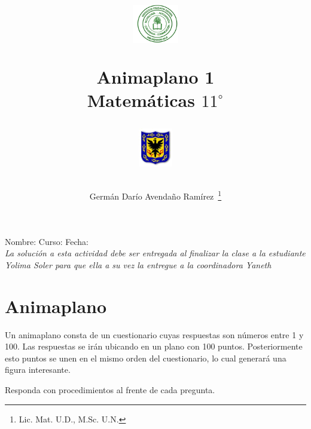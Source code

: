 \documentclass[11pt,twoside]{article}
\author{Germ\'an Dar\'io Avenda\~no Ram\'irez~\thanks{Lic. Mat. U.D., M.Sc. U.N.}}
\title{\begin{minipage}{0.2\textwidth}\includegraphics[height=1.7cm]{Images/logo-colegio.png}
\end{minipage}\hfill
\begin{minipage}{0.55\textwidth}\begin{center}
Animaplano 1\\Matemáticas $11^{\circ}$\end{center}
\end{minipage}
\begin{minipage}{.2\textwidth}
\includegraphics[height=1.7cm]{Images/logo-sed.png} 
\end{minipage}}
\date{}
\begin{document}
\maketitle
Nombre: \hrulefill Curso: \underline{\hspace{1cm}}  Fecha: \underline{\hspace{2cm}}\\

\emph{La solución a esta actividad debe ser entregada al finalizar la clase a la estudiante Yolima Soler para que ella a su vez la entregue a la coordinadora Yaneth}
\section{Animaplano}
Un animaplano consta de un cuestionario cuyas respuestas son números entre 1 y 100. Las respuestas se irán ubicando en un plano con 100 puntos. Posteriormente esto puntos se unen en el mismo orden del cuestionario, lo cual generará una figura interesante.

Responda con procedimientos al frente de cada pregunta.
\end{document}
